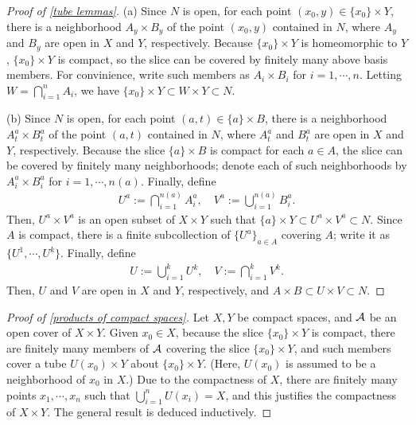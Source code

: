 \begin{proof}[Proof of \cref{tube lemmas}]
    \hangindent=0.65cm
    (a)
    Since $N$ is open, for each point $(x_0, y)\in\{x_0\}\times Y$, there is a neighborhood $A_y\times B_y$ of the point $(x_0, y)$ contained in $N$, where $A_y$ and $B_y$ are open in $X$ and $Y$, respectively.
    Because $\{x_0\}\times Y$ is homeomorphic to $Y$, $\{x_0\}\times Y$ is compact, so the slice can be covered by finitely many above basis members.
    For convinience, write such members as $A_i\times B_i$ for $i=1, \cdots, n$.
    Letting $W=\bigcap_{i=1}^n A_i$, we have $\{x_0\}\times Y\subset W\times Y\subset N$.
    
    \noindent(b)
    Since $N$ is open, for each point $(a, t)\in\{a\}\times B$, there is a neighborhood $A_t^a\times B_t^a$ of the point $(a, t)$ contained in $N$, where $A_t^a$ and $B_t^a$ are open in $X$ and $Y$, respectively.
    Because the slice $\{a\}\times B$ is compact for each $a\in A$, the slice can be covered by finitely many neighborhoods; denote each of such neighborhoods by $A_i^a\times B_i^a$ for $i=1, \cdots, n(a)$.
    Finally, define
    \begin{align*}
        U^a:=\bigcap_{i=1}^{n(a)}{A_i^a},\quad V^a:=\bigcup_{i=1}^{n(a)}{B_i^a}.
    \end{align*}
    Then, $U^a\times V^a$ is an open subset of $X\times Y$ such that $\{a\}\times Y\subset U^a\times V^a\subset N$.
    Since $A$ is compact, there is a finite subcollection of $\{U^a\}_{a\in A}$ covering $A$; write it as $\{U^1, \cdots, U^k\}$.
    Finally, define
    \begin{align*}
        U:=\bigcup_{i=1}^k U^k,\quad V:=\bigcap_{i=1}^k V^k.
    \end{align*}
    Then, $U$ and $V$ are open in $X$ and $Y$, respectively, and $A\times B\subset U\times V\subset N$.
\end{proof}
\begin{proof}[Proof of \cref{products of compact spaces}]
    Let $X, Y$ be compact spaces, and ${\mathcal{A}}$ be an open cover of $X\times Y$.
    Given $x_0\in X$, because the slice $\{x_0\}\times Y$ is compact, there are finitely many members of ${\mathcal{A}}$ covering the slice $\{x_0\}\times Y$, and such members cover a tube $U(x_0)\times Y$ about $\{x_0\}\times Y$. (Here, $U(x_0)$ is assumed to be a neighborhood of $x_0$ in $X$.)
    Due to the compactness of $X$, there are finitely many points $x_1, \cdots, x_n$ such that $\bigcup_{i=1}^n U(x_i)=X$, and this justifies the compactness of $X\times Y$.
    The general result is deduced inductively.
\end{proof}

